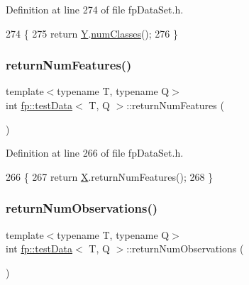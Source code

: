 Definition at line 274 of file fp\+Data\+Set.\+h.


\begin{DoxyCode}
274                                      \{
275             \textcolor{keywordflow}{return} \hyperlink{classfp_1_1testData_a9421a63841491860ddeeb1f7fa0d4219}{Y}.\hyperlink{classfp_1_1inputYDataClassification_ade4b45e3da55233214135b6de8976297}{numClasses}();
276         \}
\end{DoxyCode}
\mbox{\label{classfp_1_1testData_a8a04f896ee478d7c5cb37aeedfe7b821}} 
\subsubsection{\texorpdfstring{return\+Num\+Features()}{returnNumFeatures()}}
{\footnotesize\ttfamily template$<$typename T, typename Q$>$ \\
int \hyperlink{classfp_1_1testData}{fp\+::test\+Data}$<$ T, Q $>$\+::return\+Num\+Features (\begin{DoxyParamCaption}{ }\end{DoxyParamCaption})\hspace{0.3cm}{\ttfamily [inline]}}



Definition at line 266 of file fp\+Data\+Set.\+h.


\begin{DoxyCode}
266                                       \{
267             \textcolor{keywordflow}{return} \hyperlink{classfp_1_1testData_ad85120d23de2f6c10d6e9455e5f5adb9}{X}.returnNumFeatures();
268         \}
\end{DoxyCode}
\mbox{\label{classfp_1_1testData_af9dd7a4aa116d99a11838a02f2154c08}} 
\subsubsection{\texorpdfstring{return\+Num\+Observations()}{returnNumObservations()}}
{\footnotesize\ttfamily template$<$typename T, typename Q$>$ \\
int \hyperlink{classfp_1_1testData}{fp\+::test\+Data}$<$ T, Q $>$\+::return\+Num\+Observations (\begin{DoxyParamCaption}{ }\end{DoxyParamCaption})\hspace{0.3cm}{\ttfamily [inline]}}



